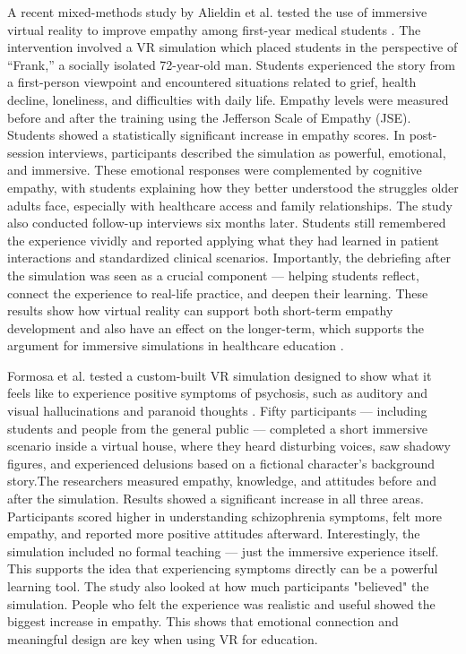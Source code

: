 A recent mixed-methods study by Alieldin et al. tested the use of immersive virtual reality to improve empathy among first-year medical students \cite{Alieldin2024}. The intervention involved a VR simulation which placed students in the perspective of “Frank,” a socially isolated 72-year-old man. Students experienced the story from a first-person viewpoint and encountered situations related to grief, health decline, loneliness, and difficulties with daily life. Empathy levels were measured before and after the training using the Jefferson Scale of Empathy (JSE). Students showed a statistically significant increase in empathy scores. In post-session interviews, participants described the simulation as powerful, emotional, and immersive. These emotional responses were complemented by cognitive empathy, with students explaining how they better understood the struggles older adults face, especially with healthcare access and family relationships. The study also conducted follow-up interviews six months later. Students still remembered the experience vividly and reported applying what they had learned in patient interactions and standardized clinical scenarios. Importantly, the debriefing after the simulation was seen as a crucial component — helping students reflect, connect the experience to real-life practice, and deepen their learning. These results show how virtual reality can support both short-term empathy development and also have an effect on the longer-term, which supports the argument for immersive simulations in healthcare education \cite{Alieldin2024}.

\vspace{1em}

Formosa et al. tested a custom-built VR simulation designed to show what it feels like to experience positive symptoms of psychosis, such as auditory and visual hallucinations and paranoid thoughts \cite{Formosa2018}. Fifty participants — including students and people from the general public — completed a short immersive scenario inside a virtual house, where they heard disturbing voices, saw shadowy figures, and experienced delusions based on a fictional character’s background story.The researchers measured empathy, knowledge, and attitudes before and after the simulation. Results showed a significant increase in all three areas. Participants scored higher in understanding schizophrenia symptoms, felt more empathy, and reported more positive attitudes afterward. Interestingly, the simulation included no formal teaching — just the immersive experience itself. This supports the idea that experiencing symptoms directly can be a powerful learning tool. The study also looked at how much participants "believed" the simulation. People who felt the experience was realistic and useful showed the biggest increase in empathy. This shows that emotional connection and meaningful design are key when using VR for education. 

